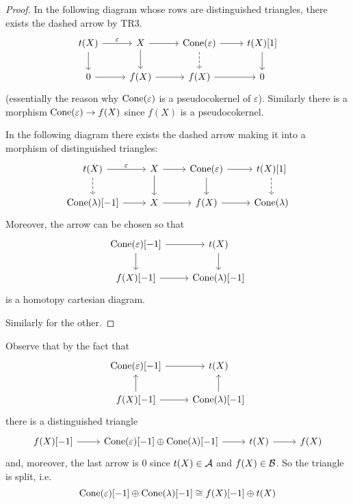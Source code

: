 \begin{proof}
  In the following diagram whose rows are distinguished triangles, there exists the dashed arrow by TR3.
  \begin{equation*}
    \begin{tikzcd}
      t(X)\arrow{r}{\varepsilon}\arrow{d}
      & X\arrow{r}\arrow{d}
      & \Cone(\varepsilon)\arrow{r}\arrow[dashed]{d}
      & t(X)[1]\arrow{d}
      \\
      0\arrow{r}
      & f(X)\arrow{r}
      & f(X)\arrow{r}
      & 0
    \end{tikzcd}
  \end{equation*}
  (essentially the reason why $\operatorname{Cone}(\varepsilon)$ is a pseudocokernel of $\varepsilon$). Similarly there is a morphism $\operatorname{Cone}(\varepsilon)\to f(X)$ since $f(X)$ is a pseudocokernel.

  In the following diagram there exists the dashed arrow making it into a morphism of distinguished triangles:
  \begin{equation*}
    \begin{tikzcd}
      t(X)\arrow{r}{\varepsilon}\arrow[dashed]{d}
      & X\arrow{r}\arrow{d}
      & \Cone(\varepsilon)\arrow{r}\arrow{d}
      & t(X)[1]\arrow[dashed]{d}\\
      \Cone(\lambda)[-1]\arrow{r}
      & X\arrow{r}
      & f(X)\arrow{r}
      & \Cone(\lambda)
    \end{tikzcd}
  \end{equation*}
  Moreover, the arrow can be chosen so that
  \begin{equation*}
    \begin{tikzcd}
      \Cone(\varepsilon)[-1]\arrow{r}\arrow{d}&t(X)\arrow{d}\\
      f(X)[-1]\arrow{r}&\Cone(\lambda)[-1]
    \end{tikzcd}
  \end{equation*}
  is a homotopy cartesian diagram.

  Similarly for the other.
\end{proof}

Observe that by the fact that
\begin{equation*}
  \begin{tikzcd}
    \Cone(\varepsilon)[-1]\arrow{r}&t(X)\\
    f(X)[-1]\arrow{r}\arrow{u}&\Cone(\lambda)[-1]\arrow{u}
  \end{tikzcd}
\end{equation*}
there is a distinguished triangle
\begin{equation*}
  \begin{tikzcd}
    f(X)[-1]\arrow{r}
    & \Cone(\varepsilon)[-1]\oplus \Cone(\lambda)[-1]\arrow{r}
    & t(X)\arrow{r}
    & f(X)
  \end{tikzcd}
\end{equation*}
and, moreover, the last arrow is 0 since $t(X)\in\mathcal{A}$ and $f(X)\in\mathcal{B}$. So the triangle is split, i.e.
\begin{equation*}
  \operatorname{Cone}(\varepsilon)[-1]\oplus \operatorname{Cone}(\lambda)[-1]
  \cong f(X)[-1]\oplus t(X)
\end{equation*}

